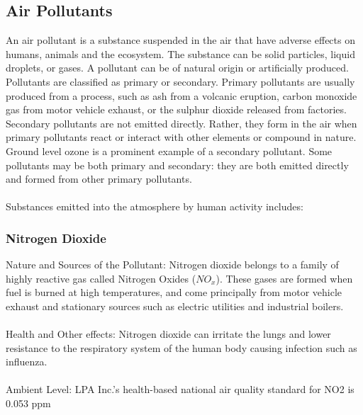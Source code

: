 \subsection{Air Pollutants}
An air pollutant is a substance suspended in the air that have adverse effects on humans, animals and the ecosystem. The substance can be solid particles, liquid droplets, or gases. A pollutant can be of natural origin or artificially produced. Pollutants are classified as primary or secondary. Primary pollutants are usually produced from a process, such as ash from a volcanic eruption, carbon monoxide gas from motor vehicle exhaust, or the sulphur dioxide released from factories. Secondary pollutants are not emitted directly. Rather, they form in the air when primary pollutants react or interact with other elements or compound in nature. Ground level ozone is a prominent example of a secondary pollutant. Some pollutants may be both primary and secondary: they are both emitted directly and formed from other primary pollutants.
\\
\\
Substances emitted into the atmosphere by human activity includes:
\subsubsection{Nitrogen Dioxide}
Nature and Sources of the Pollutant: Nitrogen dioxide belongs to a family of highly reactive gas called Nitrogen Oxides ($NO_x$). These gases are formed when fuel is burned at high temperatures, and come principally from motor vehicle exhaust and stationary sources such as electric utilities and industrial boilers.
\\
\\
Health and Other effects: Nitrogen dioxide can irritate the lungs and lower resistance to the respiratory system of the human body causing infection such as influenza.
\\
\\
Ambient Level: LPA Inc.'s health-based national air quality standard for NO2 is 0.053 ppm

